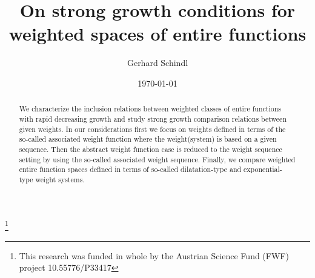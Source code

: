 \documentclass[10pt]{amsart}%
\title[On strong growth conditions for weighted spaces of entire functions]
{On strong growth conditions for weighted spaces of entire functions}
\author[G.~Schindl]{Gerhard Schindl}
\numberwithin{equation}{section}
\theoremstyle{plain}
\begin{document}
\begin{abstract}
We characterize the inclusion relations between weighted classes of entire functions with rapid decreasing growth and study strong growth comparison relations between given weights. In our considerations first we focus on weights defined in terms of the so-called associated weight function where the weight(system) is based on a given sequence. Then the abstract weight function case is reduced to the weight sequence setting by using the so-called associated weight sequence. Finally, we compare weighted entire function spaces defined in terms of so-called dilatation-type and exponential-type weight systems.
\end{abstract}

\thanks{This research was funded in whole by the Austrian Science Fund (FWF) project 10.55776/P33417}
\date{\today}

\maketitle

\end{document}
